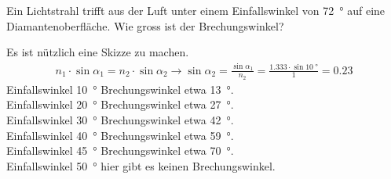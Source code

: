\documentclass[paper=a4,twoside=true,,DIV13,BCOR1cm]{scrartcl}
\begin{document}
\begin{aufgabe}
	Ein Lichtstrahl trifft aus der Luft unter einem Einfallswinkel von \SI{72}{\degree} auf eine Diamantenoberfläche.
	Wie gross ist der Brechungswinkel?
\end{aufgabe}


\begin{loesung}
		Es ist nützlich eine Skizze zu machen.
		\begin{eqnarray*}
			n_1\cdot\sin\alpha_1 = n_2\cdot\sin\alpha_2 \to \sin\alpha_2=\frac{\sin\alpha_1}{n_2}=\frac{\num{1.333}\cdot\sin\SI{10}{\degree}}{1}=\num{0.23}
		\end{eqnarray*}
		Einfallswinkel \SI{10}{\degree} Brechungswinkel etwa \SI{13}{\degree}.\\
		Einfallswinkel \SI{20}{\degree} Brechungswinkel etwa \SI{27}{\degree}.\\
		Einfallswinkel \SI{30}{\degree} Brechungswinkel etwa \SI{42}{\degree}.\\
		Einfallswinkel \SI{40}{\degree} Brechungswinkel etwa \SI{59}{\degree}.\\
		Einfallswinkel \SI{45}{\degree} Brechungswinkel etwa \SI{70}{\degree}.\\
		Einfallswinkel \SI{50}{\degree} hier gibt es keinen Brechungswinkel.
\end{loesung}
\end{document}
